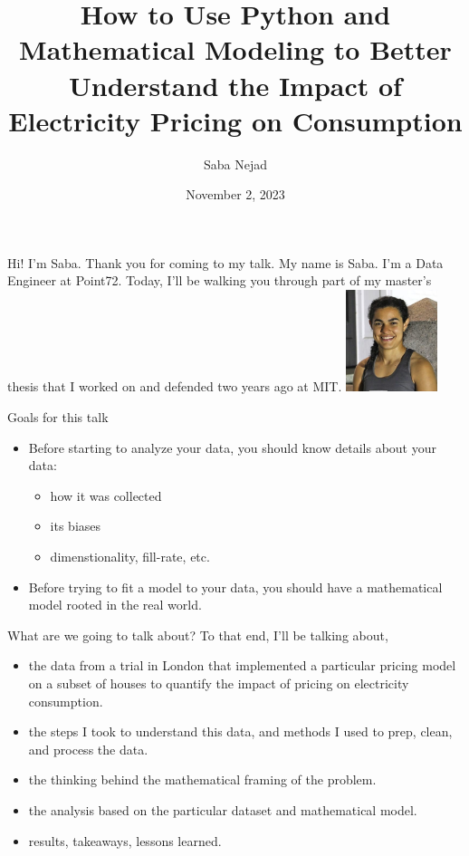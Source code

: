 \documentclass{beamer}
\title{How to Use Python and Mathematical Modeling to Better Understand the Impact of Electricity Pricing on Consumption}
\date{November 2, 2023}
\author{Saba Nejad}
\institute{PyData NYC 2023}
\begin{document}
\maketitle

\begin{frame}{Hi! I'm Saba. Thank you for coming to my talk.}
  \vspace{1cm}
  My name is Saba. I'm a Data Engineer at Point72. Today, I'll be walking you through part of my master's thesis that I worked on and defended two years ago at MIT.
  \newline
  \newline
  \includegraphics[width=0.2\textwidth]{images/saba-nejad.png}
\end{frame}

\begin{frame}{Goals for this talk}
  \begin{itemize}
  \item<+-> Before starting to analyze your data, you should know details about your data:
    \begin{itemize}
      \item how it was collected
      \item its biases
      \item dimenstionality, fill-rate, etc.
    \end{itemize}
  \item<+-> Before trying to fit a model to your data, you should have a mathematical model rooted in the real world.
  \end{itemize}
\end{frame}

\begin{frame}{What are we going to talk about?}
  To that end, I'll be talking about,
  \begin{itemize}
    \item<+-> the data from a trial in London that implemented a particular pricing model on a subset of houses to quantify the impact of pricing on electricity consumption.
    \item<+-> the steps I took to understand this data, and methods I used to prep, clean, and process the data.
    \item<+-> the thinking behind the mathematical framing of the problem.
    \item<+-> the analysis based on the particular dataset and mathematical model.
    \item<+-> results, takeaways, lessons learned.
  \end{itemize}
\end{frame}
\end{document}
